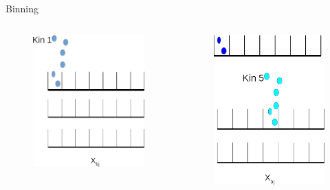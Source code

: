 \documentclass{beamer}
\begin{document}
\begin{frame}{Binning}
	\begin{columns}
		\begin{figure}
			\includegraphics[width=5cm]{../images/bin_ex_kin1}
		\end{figure}

		\begin{figure}
			\includegraphics[width=5cm]{../images/bin_ex_kin5}
		\end{figure}
	\end{columns}
\end{frame}
\end{document}
